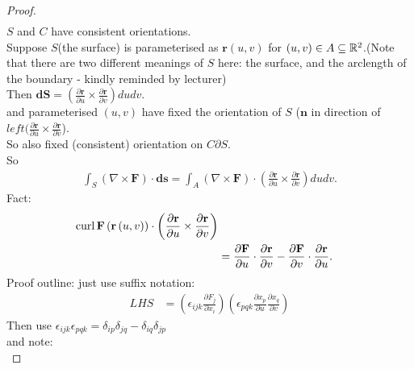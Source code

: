 \documentclass[a4paper]{article}
\begin{document}
\begin{proof}
\begin{equation*}
\begin{aligned}
\end{aligned}
\end{equation*}
$S$ and $C$ have consistent orientations.\\
Suppose $S$(the surface) is parameterised as $\mathbf{r}\left(u,v\right)$ for $\left(u,v\right)\in A\subseteq \mathbb{R}^2$.(Note that there are two different meanings of $S$ here: the surface, and the arclength of the boundary - kindly reminded by lecturer)\\
Then $\mathbf{dS}=\left(\frac{\partial \mathbf{r}}{\partial u}\times \frac{\partial\mathbf{r}}{\partial v}\right) dudv$.\\
and parameterised $\left(u,v\right)$ have fixed the orientation of $S$ ($\mathbf{n}$ in direction of $left(\frac{\partial \mathbf{r}}{\partial u}\times \frac{\partial\mathbf{r}}{\partial v}$).\\
So also fixed (consistent) orientation on $C\partial S$.\\
So 
\begin{equation*}
\begin{aligned}
\int_S \left(\nabla\times\mathbf{F}\right)\cdot\mathbf{ds}=\int_A \left(\nabla\times\mathbf{F}\right)\cdot\left(\frac{\partial \mathbf{r}}{\partial u}\times \frac{\partial\mathbf{r}}{\partial v}\right)dudv.
\end{aligned}
\end{equation*}
Fact:
\begin{equation*}
\begin{aligned}
\operatorname{curl} \mathbf{F}\left(\mathbf{r}\left(u,v\right)\right)\cdot \left(\frac{\partial \mathbf{r}}{\partial u}\times \frac{\partial\mathbf{r}}{\partial v}\right)\\
&= \frac{\partial \mathbf{F}}{\partial u}\cdot \frac{\partial \mathbf{r}}{\partial v}-\frac{\partial \mathbf{F}}{\partial v}\cdot \frac{\partial \mathbf{r}}{\partial u}.
\end{aligned}
\end{equation*}
Proof outline: just use suffix notation:
\begin{equation} \label{eq:2}
\begin{aligned}
LHS &= \left(\epsilon_{ijk} \frac{\partial F_j}{\partial x_i}\right)\left(\epsilon_{pqk} \frac{\partial x_p}{\partial u}\frac{\partial x_q}{\partial v}\right)
\end{aligned}
\end{equation}
Then use $\epsilon_{ijk}\epsilon_{pqk}=\delta_{ip}\delta_{jq}-\delta_{iq}\delta_{jp}$\\
and note:
\begin{equation*}

\end{equation*}
\end{proof}
\end{document}
